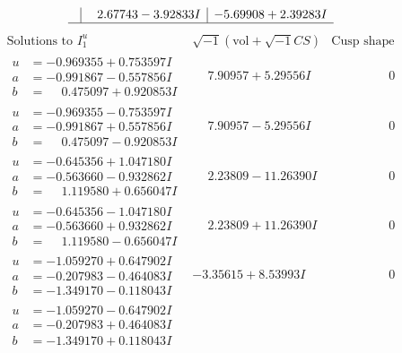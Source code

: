 \documentclass[1p]{elsarticle_modified}
\theoremstyle{definition}
\newcommand{\I}{\sqrt{-1}}
\begin{document}
$$\begin{array}{c|c|c}
 & \phantom{-}2.67743 - 3.92833 I & -5.69908 + 2.39283 I\\
 \hline 
 \end{array}$$\newpage$$\begin{array}{c|c|c}  
\text{Solutions to }I^u_{1}& \I (\text{vol} + \sqrt{-1}CS) & \text{Cusp shape}\\
 \hline 
\begin{aligned}
u &= -0.969355 + 0.753597 I \\
a &= -0.991867 - 0.557856 I \\
b &= \phantom{-}0.475097 + 0.920853 I\end{aligned}
 & \phantom{-}7.90957 + 5.29556 I & \phantom{-0.000000 } 0 \\ \hline\begin{aligned}
u &= -0.969355 - 0.753597 I \\
a &= -0.991867 + 0.557856 I \\
b &= \phantom{-}0.475097 - 0.920853 I\end{aligned}
 & \phantom{-}7.90957 - 5.29556 I & \phantom{-0.000000 } 0 \\ \hline\begin{aligned}
u &= -0.645356 + 1.047180 I \\
a &= -0.563660 - 0.932862 I \\
b &= \phantom{-}1.119580 + 0.656047 I\end{aligned}
 & \phantom{-}2.23809 - 11.26390 I & \phantom{-0.000000 } 0 \\ \hline\begin{aligned}
u &= -0.645356 - 1.047180 I \\
a &= -0.563660 + 0.932862 I \\
b &= \phantom{-}1.119580 - 0.656047 I\end{aligned}
 & \phantom{-}2.23809 + 11.26390 I & \phantom{-0.000000 } 0 \\ \hline\begin{aligned}
u &= -1.059270 + 0.647902 I \\
a &= -0.207983 - 0.464083 I \\
b &= -1.349170 - 0.118043 I\end{aligned}
 & -3.35615 + 8.53993 I & \phantom{-0.000000 } 0 \\ \hline\begin{aligned}
u &= -1.059270 - 0.647902 I \\
a &= -0.207983 + 0.464083 I \\
b &= -1.349170 + 0.118043 I\end{aligned}

\end{array}$$
\end{document}
